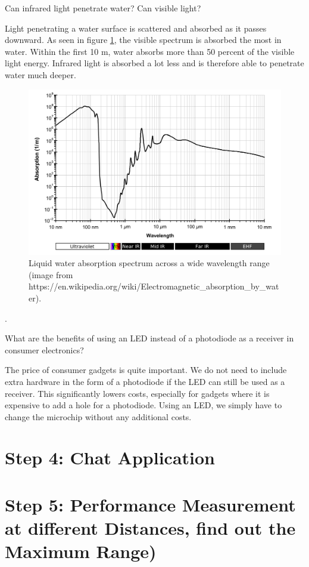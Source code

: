 \documentclass[
	12pt, %
]{fphw}
\begin{document}
\begin{problem}
	Can infrared light penetrate water? Can visible light?
\end{problem}
Light penetrating a water surface is scattered and absorbed as it passes downward. As seen in figure \ref{fig:water_absorption}, the visible spectrum is absorbed the most in water. Within the first 10 m, water absorbs more than 50 percent of the visible light energy. Infrared light is absorbed a lot less and is therefore able to penetrate water much deeper.

\begin{figure}[!htbp] 
	\centering
	\includegraphics[width=0.75\columnwidth]{figures/water_absorption.png}
	\caption{Liquid water absorption spectrum across a wide wavelength range (image from https://en.wikipedia.org/wiki/Electromagnetic\_absorption\_by\_water).}
	\label{fig:water_absorption}
\end{figure}
\FloatBarrier. 

\begin{problem}
	What are the benefits of using an LED instead of a photodiode as a receiver in consumer electronics?
\end{problem}
The price of consumer gadgets is quite important. We do not need to include extra hardware in the form of a photodiode if the LED can still be used as a receiver. This significantly lowers costs, especially for gadgets where it is expensive to add a hole for a photodiode. Using an LED, we simply have to change the microchip without any additional costs.


\section*{Step 4: Chat Application}



\section*{Step 5: Performance Measurement at different Distances, find out the Maximum Range)}




\clearpage
\printbibliography
\end{document}
